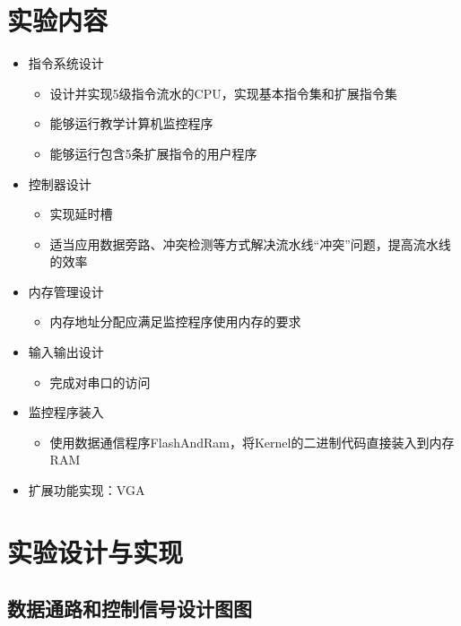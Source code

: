 \documentclass{article}
\begin{document}
\section{实验内容}
\begin{itemize}
\item 指令系统设计
	\begin{itemize}
	\item 设计并实现5级指令流水的CPU，实现基本指令集和扩展指令集
	\item 能够运行教学计算机监控程序
	\item 能够运行包含5条扩展指令的用户程序
	\end{itemize}
\item 控制器设计
	\begin{itemize}
	\item 实现延时槽
	\item 适当应用数据旁路、冲突检测等方式解决流水线“冲突”问题，提高流水线的效率
	\end{itemize}
\item 内存管理设计
	\begin{itemize}
	\item 内存地址分配应满足监控程序使用内存的要求
	\end{itemize}
\item 输入输出设计
	\begin{itemize}
	\item 完成对串口的访问
	\end{itemize}
\item 监控程序装入
	\begin{itemize}
	\item 使用数据通信程序FlashAndRam，将Kernel的二进制代码直接装入到内存RAM
	\end{itemize}
\item 扩展功能实现：VGA 
\end{itemize}


\section{实验设计与实现}

\subsection{数据通路和控制信号设计图图}
\end{document}
